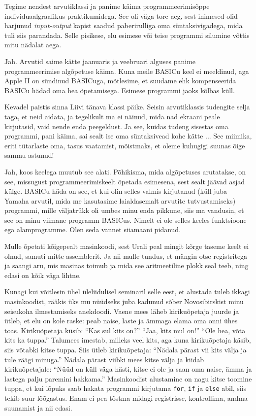 Tegime nendest arvutiklassi ja panime käima
programmeerimisõppe individuaalgraafikus praktikumidega. See oli väga
tore aeg, sest inimesed olid harjunud \emph{input-output} kapist saadud paberirulliga oma süntaksivigadega, mida tuli siis parandada.
Selle pisikese, elu esimese või teise programmi silumine võttis mitu
nädalat aega.


Jah. Arvutid saime kätte jaanuaris ja veebruari alguses panime
programmeerimise algõpetuse käima. Kuna meile BASICu keel ei
meeldinud, aga Apple II on sündinud BASICuga, mõtlesime, et
suudame ehk kompenseerida BASICu hädad oma hea õpetamisega. Esimese
programmi jaoks kõlbas küll.

Kevadel paistis sinna Liivi tänava klassi päike. Seisin arvutiklassis tudengite
selja taga, et neid aidata, ja tegelikult ma ei näinud, mida nad
ekraani peale kirjutasid, vaid nende enda peegeldust. Ja see, kuidas tudeng
sisestas oma programmi, pani käima, sai sealt ise oma süntaksivead kohe kätte ...
See miimika, eriti tütarlaste oma, tasus vaatamist, mõistmaks, et oleme kuhugigi suunas õige sammu astunud!


Jah, koos keelega muutub see alati. Põhikisma, mida algõpetuses arutatakse, on
see, missugust programmeerimiskeelt õpetada esimesena, sest sealt jäävad
asjad külge. BASICu häda on see, et kui olin selles
valmis kirjutanud (küll juba Yamaha arvutil, mida me kasutasime laialdasemalt
arvutite tutvustamiseks) programmi, mille väljatrükk oli umbes minu enda
pikkune, siis ma vandusin, et see on minu viimane programm BASICus. Nimelt ei ole selles keeles
funktsioone ega alamprogramme. Olen seda vannet siiamaani pidanud.

Mulle õpetati kõigepealt masinkoodi, sest Urali
peal mingit kõrge taseme keelt ei olnud, samuti mitte assemblerit. Ja nii
mulle tundus, et mängin otse registritega ja
saangi aru, mis masinas toimub ja mida see aritmeetiline plokk seal teeb, ning edasi on kõik väga lihtne.

Kunagi kui võitlesin ühel üleliidulisel
seminaril selle eest, et alustada tuleb ikkagi masinkoodist, rääkis üks mu nüüdseks
juba kadunud sõber Novosibirskist minu seisukoha
ilmestamiseks anekdoodi. Vaene mees läheb
kirikuõpetaja juurde ja ütleb, et elu on kole raske: peab naise, laste ja ämmaga
elama oma onni ühes toas. Kirikuõpetaja
küsib: \enquote{Kas sul kits on?} \enquote{Jaa, kits mul on!} \enquote{Ole hea, võta kits ka tuppa.} Talumees imestab, milleks veel kits, aga kuna kirikuõpetaja käsib, siis võtabki
kitse tuppa. Siis ütleb kirikuõpetaja: \enquote{Nädala pärast vii kits välja
ja tule räägi minuga.} Nädala pärast viibki mees kitse välja ja kiidab kirikuõpetajale:
\enquote{Nüüd on küll väga hästi, kitse ei ole ja saan oma naise, ämma ja lastega palju paremini hakkama.} Masinkoodist alustamine on
nagu kitse toomine tuppa, et kui lõpuks saab hakata programmi kirjutama
\verb|for|, \verb|if| ja \verb|else| abil, siis tekib suur lõõgastus. Enam ei pea
tõstma midagi registrisse, kontrollima, andma suunamist ja nii edasi.

